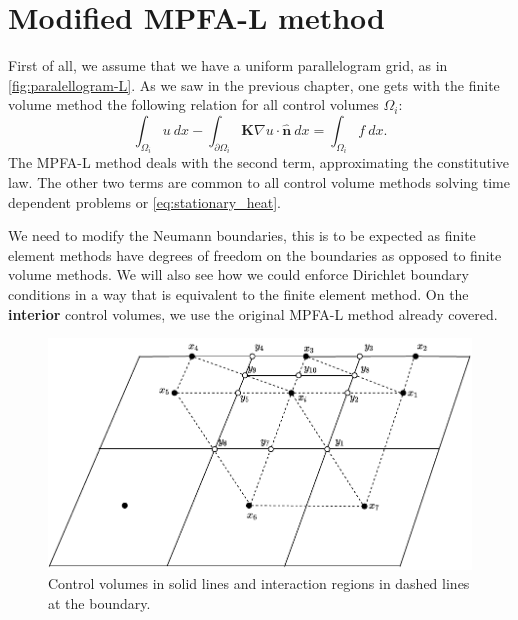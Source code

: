 \documentclass[../Main/main.tex]{subfiles}
\begin{document}
	\section{Modified MPFA-L method}
	First of all, we assume that we have a uniform parallelogram grid, as in \ref{fig:paralellogram-L}. 
	As we saw in the previous chapter, one gets with the finite volume method the following relation for all control volumes $\Omega_i$:
	\begin{equation}
		\int_{\Omega_i} u \ dx - \int_{\partial \Omega_i}\bm{K}\nabla u \cdot \hat{\pmb{n}}\ dx = \int_{\Omega_i} f \ dx.
	\end{equation}
	The MPFA-L method deals with the second term, approximating the constitutive law. The other two terms are common to all control volume methods solving time dependent problems or \eqref{eq:stationary_heat}.
	\par
	We need to modify the Neumann boundaries, this is to be expected as finite element methods have degrees of freedom on the boundaries as opposed to finite volume methods. We will also see how we could enforce Dirichlet boundary conditions in a way that is equivalent to the finite element method. On the \textbf{interior} control volumes, we use the original MPFA-L method already covered.
	\par
	\begin{figure}
		\centering
		\includegraphics{modified_L_scheme.pdf}
		\caption{Control volumes in solid lines and interaction regions in dashed lines at the boundary.}
		\label{fig:volemes along boundary}
	\end{figure}
\end{document}
